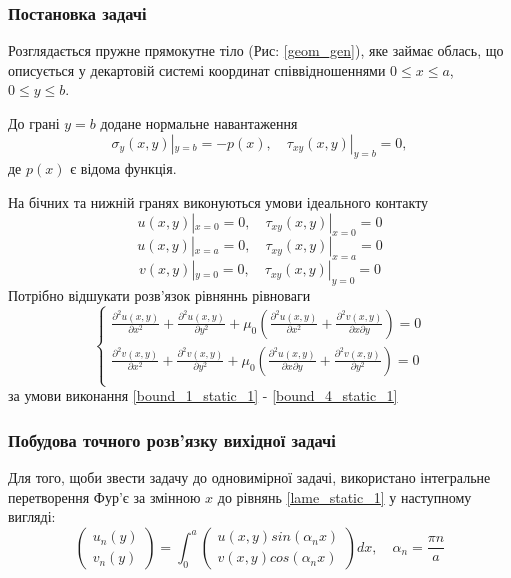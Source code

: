 \subsubsection{Постановка задачі}
Розглядається пружне прямокутне тіло (Рис: \ref{geom_gen}), яке займає облась,
що описується у декартовій системі координат співвідношеннями $0 \le x \le a$, $0 \le y \le b$.

До грані $y=b$ додане нормальне навантаження
\begin{equation}\label{bound_1_static_1}
    \sigma_y(x, y) |_{y=b} = -p(x), \quad  \tau_{xy}(x,y) |_{y=b} =0,
\end{equation}
де $p(x)$ є відома функція.

На бічних та нижній гранях виконуються умови ідеального контакту
\begin{equation}\label{bound_2_static_1}
    u(x,y) |_{x=0} = 0, \quad \tau_{xy}(x,y) |_{x=0} =0
\end{equation}
\begin{equation}\label{bound_3_static_1}
    u(x,y) |_{x=a} = 0, \quad \tau_{xy}(x,y) |_{x=a} =0
\end{equation}
\begin{equation}\label{bound_4_static_1}
    v(x,y) |_{y=0} = 0, \quad \tau_{xy}(x,y) |_{y=0} =0
\end{equation}
Потрібно відшукати розв'язок рівняннь рівноваги
\begin{equation}\label{lame_static_1}
    \begin{cases}
        \frac{\partial^2 u(x,y)}{\partial x^2} + \frac{\partial^2 u(x,y)}{\partial y^2} + \mu_0 (\frac{\partial^2 u(x,y)}{\partial x^2} + \frac{\partial^2 v(x,y)}{\partial x\partial y}) = 0 \\
        \frac{\partial^2 v(x,y)}{\partial x^2} + \frac{\partial^2 v(x,y)}{\partial y^2} + \mu_0 (\frac{\partial^2 u(x,y)}{\partial x \partial y} + \frac{\partial^2 v(x,y)}{\partial y^2}) = 0 \\
    \end{cases}
\end{equation}
за умови виконання \eqref{bound_1_static_1} - \eqref{bound_4_static_1}

\subsubsection{Побудова точного розв'язку вихідної задачі}
Для того, щоби звести задачу до одновимірної задачі, використано інтегральне перетворення Фур'є за змінною $x$ до рівнянь \eqref{lame_static_1} у наступному вигляді:
\begin{equation}
    \begin{pmatrix}
        u_n(y) \\
        v_n(y)
    \end{pmatrix} = \int_{0}^{a} 
    \begin{pmatrix}
        u(x,y) sin(\alpha_n x) \\
        v(x,y) cos(\alpha_n x)
    \end{pmatrix} dx, \quad \alpha_n = \frac{\pi n}{a}
\end{equation}

